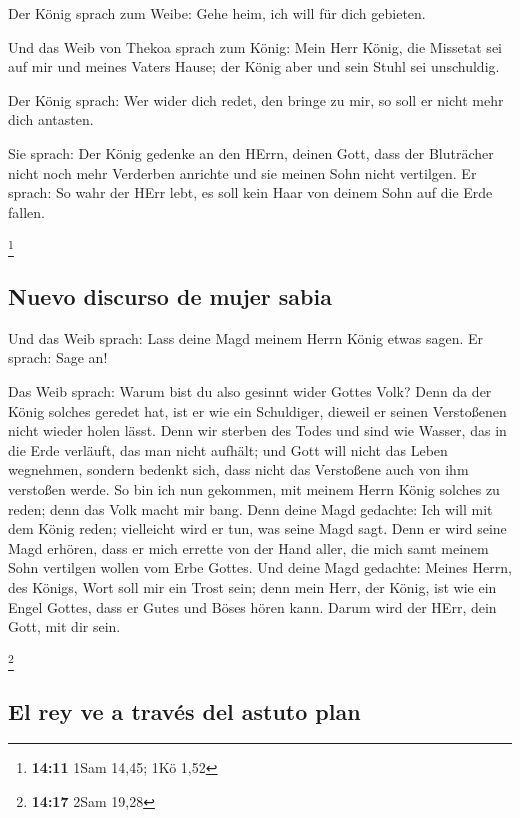  Der König sprach zum Weibe: Gehe heim, ich will für dich
gebieten.

 Und das Weib von Thekoa sprach zum König: Mein Herr
König, die Missetat sei auf mir und meines Vaters Hause; der König aber
und sein Stuhl sei unschuldig.

 Der König sprach: Wer wider dich redet, den bringe zu
mir, so soll er nicht mehr dich antasten.

 Sie sprach: Der König gedenke an den HErrn, deinen Gott,
dass der Bluträcher nicht noch mehr Verderben anrichte und sie meinen
Sohn nicht vertilgen. Er sprach: So wahr der HErr lebt, es soll kein
Haar von deinem Sohn auf die Erde fallen.

\footnote{\textbf{14:11} 1Sam 14,45; 1Kö 1,52}

\hypertarget{nuevo-discurso-de-mujer-sabia}{%
\subsection{Nuevo discurso de mujer
sabia}\label{nuevo-discurso-de-mujer-sabia}}

 Und das Weib sprach: Lass deine Magd meinem Herrn König
etwas sagen. Er sprach: Sage an!

 Das Weib sprach: Warum bist du also gesinnt wider Gottes
Volk? Denn da der König solches geredet hat, ist er wie ein Schuldiger,
dieweil er seinen Verstoßenen nicht wieder holen lässt. 
Denn wir sterben des Todes und sind wie Wasser, das in die Erde
verläuft, das man nicht aufhält; und Gott will nicht das Leben
wegnehmen, sondern bedenkt sich, dass nicht das Verstoßene auch von ihm
verstoßen werde.  So bin ich nun gekommen, mit meinem
Herrn König solches zu reden; denn das Volk macht mir bang. Denn deine
Magd gedachte: Ich will mit dem König reden; vielleicht wird er tun, was
seine Magd sagt.  Denn er wird seine Magd erhören, dass
er mich errette von der Hand aller, die mich samt meinem Sohn vertilgen
wollen vom Erbe Gottes.  Und deine Magd gedachte: Meines
Herrn, des Königs, Wort soll mir ein Trost sein; denn mein Herr, der
König, ist wie ein Engel Gottes, dass er Gutes und Böses hören kann.
Darum wird der HErr, dein Gott, mit dir sein.

\footnote{\textbf{14:17} 2Sam 19,28}

\hypertarget{el-rey-ve-a-travuxe9s-del-astuto-plan}{%
\subsection{El rey ve a través del astuto
plan}\label{el-rey-ve-a-travuxe9s-del-astuto-plan}}

